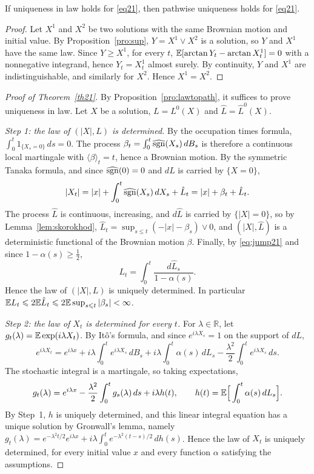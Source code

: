 \begin{proposition}\label{pro:lawtopath}
	If uniqueness in law holds for \eqref{eq21}, then pathwise uniqueness holds
	for \eqref{eq21}.
\end{proposition}

\begin{proof}
	Let $X^1$ and $X^2$ be two solutions with the same Brownian motion and
	initial value. By Proposition~\ref{pro:sup}, $Y = X^1 \vee X^2$ is a solution,
	so $Y$ and $X^1$ have the same law. Since $Y \geqslant X^1$, for every $t$,
	$\mathbb{E}[\arctan Y_t - \arctan X^1_t] = 0$ with a nonnegative integrand, hence
	$Y_t = X^1_t$ almost surely. By continuity, $Y$ and $X^1$ are
	indistinguishable, and similarly for $X^2$. Hence $X^1 = X^2$.
\end{proof}

\begin{proof}[Proof of Theorem~\ref{th21}]
	By Proposition~\ref{pro:lawtopath}, it suffices to prove uniqueness in law.
	Let $X$ be a solution, $L = L^0(X)$ and $\hat{L} = \hat{L}^0(X)$.

	\emph{Step 1: the law of $(|X|, L)$ is determined.} By the occupation times
	formula, $\int_0^t 1_{\{X_s = 0\}}\,ds = 0$. The process
	$\beta_t = \int_0^t \widehat{\operatorname{sgn}}(X_s)\,dB_s$ is therefore a continuous local
	martingale with $\langle\beta\rangle_t = t$, hence a Brownian motion. By the
	symmetric Tanaka formula, and since $\widehat{\operatorname{sgn}}(0) = 0$ and $dL$ is
	carried by $\{X = 0\}$,
	\[
		|X_t| = |x| + \int_0^t \widehat{\operatorname{sgn}}(X_s)\,dX_s + \hat{L}_t = |x| + \beta_t + \hat{L}_t .
	\]
	The process $\hat{L}$ is continuous, increasing, and $d\hat{L}$ is carried by
	$\{|X| = 0\}$, so by Lemma~\ref{lem:skorokhod},
	$\hat{L}_t = \sup_{s\leqslant t}(-|x| - \beta_s)\vee 0$, and $(|X|, \hat{L})$ is a
	deterministic functional of the Brownian motion $\beta$. Finally, by
	\eqref{eq:jump21} and since $1-\alpha(s)\geqslant \frac{1}{2}$,
	\[
		L_t = \int_0^t \frac{d\hat{L}_s}{1-\alpha(s)} .
	\]
	Hence the law of $(|X|, L)$ is uniquely determined. In particular
	$\mathbb{E} L_t \leqslant 2\mathbb{E}\hat{L}_t \leqslant 2\mathbb{E}\sup_{s\leqslant t}|\beta_s| < \infty$.

	\emph{Step 2: the law of $X_t$ is determined for every $t$.} For
	$\lambda \in \mathbb{R}$, let $g_t(\lambda)=\mathbb{E}\exp(i\lambda X_t)$. By It\^o's
	formula, and since $e^{i\lambda X_s} = 1$ on the support of $dL$,
	\[
		e^{i\lambda X_t} = e^{i\lambda x} + i\lambda\int_0^t e^{i\lambda X_s}\,dB_s
		+ i\lambda \int_0^t \alpha(s)\,dL_s - \frac{\lambda^2}{2}\int_0^t e^{i\lambda X_s}\,ds .
	\]
	The stochastic integral is a martingale, so taking expectations,
	\[
		g_t(\lambda)=e^{i\lambda x} - \frac{\lambda^2}{2}\int_0^t g_s(\lambda)\,ds+i\lambda h(t),
		\qquad h(t)=\mathbb{E}\Big[\int_0^t \alpha(s)\,dL_s\Big] .
	\]
	By Step~1, $h$ is uniquely determined, and this linear integral equation has
	a unique solution by Gronwall's lemma, namely
	$g_t(\lambda) = e^{-\lambda^2 t/2}e^{i\lambda x} + i\lambda\int_0^t e^{-\lambda^2 (t-s)/2}\,dh(s)$.
	Hence the law of $X_t$ is uniquely determined, for every initial value $x$ and
	every function $\alpha$ satisfying the assumptions.


\end{proof}
